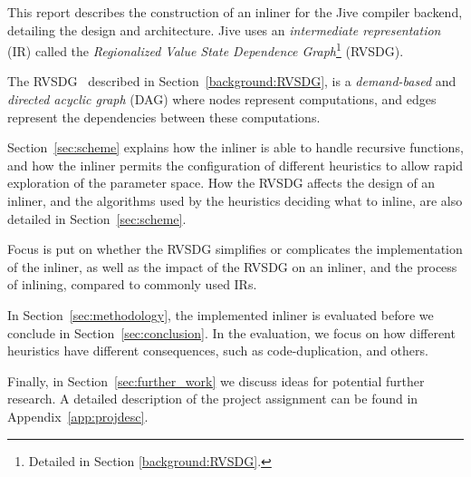 This report describes the construction of an inliner for the Jive compiler
backend, detailing the design and architecture. Jive uses an
\textit{intermediate representation} (IR) called the \textit{Regionalized Value
State Dependence Graph}\footnote{Detailed in Section \ref{background:RVSDG}.}
(RVSDG).

The RVSDG~\cite{RVSDG:HiPEACpaper} described in Section~\ref{background:RVSDG},
is a \textit{demand-based} and \textit{directed acyclic graph} (DAG) where nodes
represent computations, and edges represent the dependencies between these
computations.

Section~\ref{sec:scheme} explains how the inliner is able to handle recursive
functions, and how the inliner permits the configuration of different heuristics
to allow rapid exploration of the parameter space. How the RVSDG affects the
design of an inliner, and the algorithms used by the heuristics deciding what to
inline, are also detailed in Section~\ref{sec:scheme}.


Focus is put on whether the RVSDG simplifies or complicates the implementation
of the inliner, as well as the impact of the RVSDG on an inliner, and the
process of inlining, compared to
commonly used IRs.

In Section~\ref{sec:methodology}, the implemented inliner is evaluated
before we conclude in Section~\ref{sec:conclusion}. In the evaluation, we focus
on how different heuristics have different consequences, such as
code-duplication, and others.

Finally, in Section~\ref{sec:further_work} we discuss ideas for potential
further research. A detailed description of the project assignment can be found
in Appendix~\ref{app:projdesc}.
